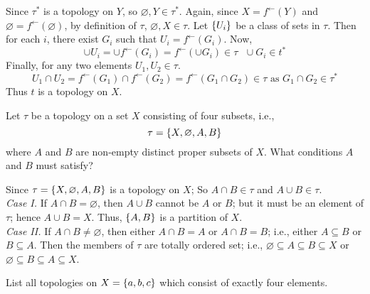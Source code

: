 \documentclass[../main-sheet.tex]{subfiles}
\begin{document}
\begin{soln}
    Since   \(\tau^*\) is a topology on  \(Y\), so  \(\varnothing,Y \in \tau^*\). Again,
    since  \(X = f^{\leftarrow}(Y)\) and  \(\varnothing = f^{\leftarrow}(\varnothing)\), by definition of  \(\tau\),  \(\varnothing, X \in \tau\).
    Let  \(\left\{U_i\right\}\) be a class of sets in  \(\tau\). Then for each  \(i\), there exist  \(G_i\) such that  \(U_i=f^{\leftarrow}(G_i)\). Now,
    \[
        \cup U_i =\cup f^{\leftarrow}(G_i) = f^{\leftarrow}(\cup G_i) \in \tau \text{ } \cup G_i \in t^*
    \]
    Finally, for any two elements  \(U_1, U_2 \in \tau\).
    \[
        U_1 \cap U_2 =f^{\leftarrow}(G_1)\cap f^{\leftarrow}(G_2)=f^{\leftarrow}(G_1 \cap G_2)\in \tau \text{ as } G_1 \cap G_2 \in \tau^*
    \]
    Thus  \(t\) is a topology on  \(X\).
\end{soln}
\begin{prob}
    Let  \(\tau\) be a topology on a set  \(X\) consisting of four
    subsets, i.e.,
    \[
        \tau=\left\{X,\varnothing, A, B\right\}
    \]
    where  \(A\) and  \(B\) are non-empty distinct proper subsets of  \(X\). What
    conditions  \(A\) and  \(B\) must satisfy?
\end{prob}
\begin{soln}
    Since  \(\tau = \left\{X,\varnothing,A,B\right\}\) is a topology on  \(X\); So  \(A \cap B \in \tau\) and  \(A\cup B\in \tau\).\\
    \emph{Case I.} If  \(A \cap B=\varnothing\), then  \(A \cup B\) cannot be  \(A\) or  \(B\); but it must be an element of  \(\tau\); hence  \(A \cup B = X\). Thus,  \(\left\{A,B\right\}\) is a partition of  \(X\).\\
    \emph{Case II.} If  \(A \cap B \neq\varnothing\), then either  \(A \cap B=A\) or  \(A \cap B=B\); i.e., either  \(A \subseteq B\) or  \(B \subseteq A\). Then the members of  \(\tau\) are totally ordered set; i.e.,  \(\varnothing\subseteq A\subseteq B\subseteq X\) or  \(\varnothing\subseteq B\subseteq A\subseteq X\).
\end{soln}
\begin{prob}
    List all topologies on  \(X =\left\{a,b,c\right\}\) which consist of exactly four elements.
\end{prob}
\end{document}
